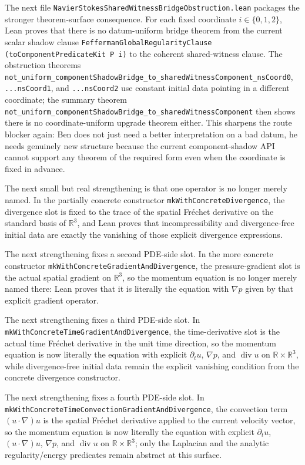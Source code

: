 \documentclass[11pt]{article}
\begin{document}
The next file \texttt{NavierStokesSharedWitnessBridgeObstruction.lean} packages
the stronger theorem-surface consequence.  For each fixed coordinate
\(i \in \{0,1,2\}\), Lean proves that there is no datum-uniform bridge theorem
from the current scalar shadow clause
\texttt{FeffermanGlobalRegularityClause (toComponentPredicateKit P i)} to the
coherent shared-witness clause.  The obstruction theorems
\texttt{not\_uniform\_componentShadowBridge\_to\_sharedWitnessComponent\_nsCoord0},
\texttt{...nsCoord1}, and \texttt{...nsCoord2} use constant initial data pointing
in a different coordinate; the summary theorem
\texttt{not\_uniform\_componentShadowBridge\_to\_sharedWitnessComponent} then
shows there is no coordinate-uniform upgrade theorem either.  This sharpens the
route blocker again: Ben does not just need a better interpretation on a bad
datum, he needs genuinely new structure because the current component-shadow API
cannot support any theorem of the required form even when the coordinate is
fixed in advance.

The next small but real strengthening is that one operator is no longer merely
named.  In the partially concrete constructor
\texttt{mkWithConcreteDivergence}, the divergence slot is fixed to the trace of
the spatial Fr\'echet derivative on the standard basis of \(\mathbb{R}^3\), and
Lean proves that incompressibility and divergence-free initial data are exactly
the vanishing of those explicit divergence expressions.

The next strengthening fixes a second PDE-side slot.  In the more concrete
constructor \texttt{mkWithConcreteGradientAndDivergence}, the pressure-gradient
slot is the actual spatial gradient on \(\mathbb{R}^3\), so the momentum
equation is no longer merely named there: Lean proves that it is literally the
equation with \(\nabla p\) given by that explicit gradient operator.

The next strengthening fixes a third PDE-side slot.  In
\texttt{mkWithConcreteTimeGradientAndDivergence}, the time-derivative slot is
the actual time Fr\'echet derivative in the unit time direction, so the
momentum equation is now literally the equation with explicit
\(\partial_t u\), \(\nabla p\), and \(\operatorname{div} u\) on
\(\mathbb{R} \times \mathbb{R}^3\), while divergence-free initial data remain
the explicit vanishing condition from the concrete divergence constructor.

The next strengthening fixes a fourth PDE-side slot.  In
\texttt{mkWithConcreteTimeConvectionGradientAndDivergence}, the convection term
\((u \cdot \nabla)u\) is the spatial Fr\'echet derivative applied to the current
velocity vector, so the momentum equation is now literally the equation with
explicit \(\partial_t u\), \((u \cdot \nabla)u\), \(\nabla p\), and
\(\operatorname{div} u\) on \(\mathbb{R} \times \mathbb{R}^3\); only the
Laplacian and the analytic regularity/energy predicates remain abstract at this
surface.
\end{document}
